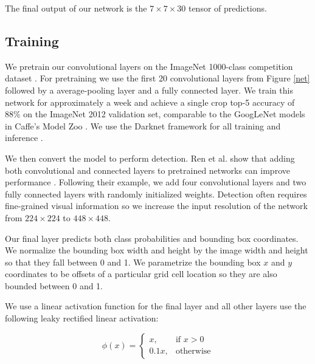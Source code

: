 \documentclass[10pt,twocolumn,letterpaper]{article}
\begin{document}
The final output of our network is the $7 \times 7 \times 30$ tensor of predictions.

\subsection{Training}
%

We pretrain our convolutional layers on the ImageNet 1000-class competition dataset \cite{ILSVRC15}. For pretraining we use the first 20 convolutional layers from Figure \ref{net} followed by a average-pooling layer and a fully connected layer. We train this network for approximately a week and achieve a single crop top-5 accuracy of 88\% on the ImageNet 2012 validation set, comparable to the GoogLeNet models in Caffe's Model Zoo \cite{zoo}. We use the Darknet framework for all training and inference \cite{darknet13}.

We then convert the model to perform detection. Ren et al. show that adding both convolutional and connected layers to pretrained networks can improve performance \cite{DBLP:journals/corr/RenHGZ015}. Following their example, we add four convolutional layers and two fully connected layers with randomly initialized weights. Detection often requires fine-grained visual information so we increase the input resolution of the network from $224 \times 224$ to $448 \times 448$.

Our final layer predicts both class probabilities and bounding box coordinates. We normalize the bounding box width and height by the image width and height so that they fall between 0 and 1. We parametrize the bounding box $x$ and $y$ coordinates to be offsets of a particular grid cell location so they are also bounded between 0 and 1.

We use a linear activation function for the final layer and all other layers use the following leaky rectified linear activation:

\begin{equation}
\phi(x) =
\begin{cases}
    x, & \text{if } x > 0\\
    0.1x, & \text{otherwise}
    \end{cases}
\end{equation}
\end{document}
